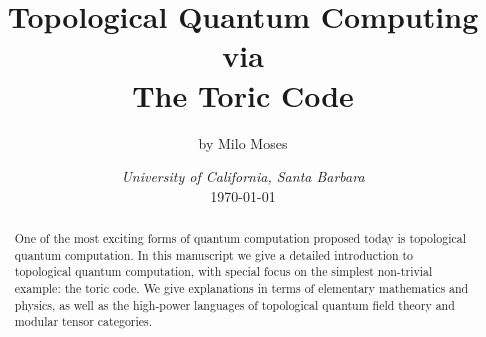 \documentclass{article}
\title{Topological Quantum Computing\\ via \\ The Toric Code}
\author{by Milo Moses}
\date{\textit{University of California, Santa Barbara} \\ [2ex] \today}
\theoremstyle{definition}
\numberwithin{figure}{section}
\begin{document}
\maketitle

\newcommand{\RR}{\mathbb{R}}
\newcommand{\HH}{\mathbb{H}}
\newcommand{\NN}{\mathbb{N}}
\newcommand{\QQ}{\mathbb{Q}}
\newcommand{\CC}{\mathbb{C}}
\newcommand{\FF}{\mathbb{F}}
\newcommand{\ZZ}{\mathbb{Z}}
\newcommand{\Zcal}{\mathcal{Z}}
\newcommand{\Ncal}{\mathcal{N}}
\newcommand{\LL}{\mathscr{L}}
\newcommand{\TT}{\mathcal{T}}
\newcommand{\Ccat}{\mathscr{C}}
\newcommand{\Dcat}{\mathscr{D}}
\newcommand{\Ecat}{\mathscr{E}}
\newcommand{\st}{\,\,\mathrm{s.t.}\,\,}
\newcommand{\mm}{\mathfrak{m}}
\newcommand{\pp}{\mathfrak{p}}
\newcommand{\Hom}{\mathrm{Hom}}
\newcommand{\Aut}{\mathrm{Aut}}
\newcommand{\Frac}{\mathrm{Frac}}
\newcommand{\tr}{\mathrm{tr}}
\newcommand{\op}{\mathrm{op}}
\newcommand{\res}{\mathrm{res}}
\newcommand{\im}{\mathrm{im}}
\newcommand{\ev}{\mathrm{ev}}
\newcommand{\coev}{\mathrm{coev}}
\newcommand{\id}{\mathrm{id}}
\newcommand{\coker}{\mathrm{coker}}
\newcommand{\SL}{\mathrm{SL}}
\newcommand{\End}{\mathrm{End}}
\newcommand{\Rep}{\bold{Rep}}
\newcommand{\Set}{\bold{Set}}
\newcommand{\Vecc}{\bold{Vec}}
\newcommand{\Top}{\bold{Top}}
\newcommand{\Grp}{\bold{Grp}}
\newcommand{\Hilb}{\bold{Hilb}}
\newcommand{\Bord}{\bold{Bord}}
\newcommand{\Cat}{\bold{Cat}}
\newcommand{\func}{\mathrm{func}}
\newcommand{\0}{\left|0\right>}
\newcommand{\1}{\left|1\right>}
\newcommand{\nullclass}{\left|\bold{0}\right>}
\newcommand{\alphaclass}{\left|\alpha\right>}
\newcommand{\betaclass}{\left|\beta\right>}
\newcommand{\alphabetaclass}{\left|\alpha\beta\right>}
\newcommand{\ppsi}{\left|\psi\right>}
\newcommand{\pphi}{\left|\phi\right>}
\newcommand{\bigleadsto}{\mathlarger{\mathlarger{\mathlarger{\leadsto}}}}
\newcommand{\vin}{\rotatebox[origin=c]{-90}{$\in$}}


\begin{abstract}
One of the most exciting forms of quantum computation proposed today is topological quantum computation. In this manuscript we give a detailed introduction to topological quantum computation, with special focus on the simplest non-trivial example: the toric code. We give explanations in terms of elementary mathematics and physics, as well as the high-power languages of topological quantum field theory and modular tensor categories.
\end{abstract}

\newpage

\tableofcontents
\end{document}

